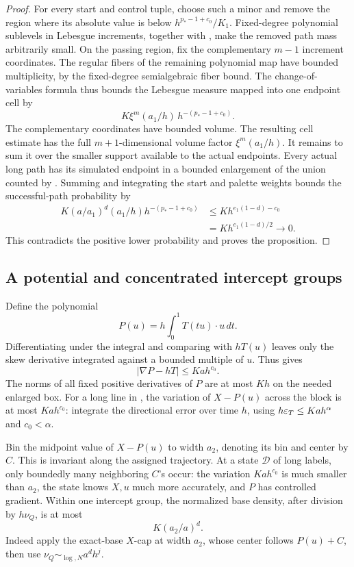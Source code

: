 \begin{proof}
For every start and control tuple, choose such a minor and remove
the region where its absolute value is below
\(h^{p_*-1+c_0}/K_1\). Fixed-degree polynomial sublevels in
Lebesgue increments, together with
, make the removed path mass
arbitrarily small. On the passing region, fix the complementary
\(m-1\) increment coordinates. The regular fibers of the remaining
polynomial map have bounded multiplicity, by the fixed-degree
semialgebraic fiber bound. The change-of-variables formula thus
bounds the Lebesgue measure mapped into one endpoint cell by
\[
 K\xi^m(a_1/h)\,h^{-(p_*-1+c_0)}.
\]
The complementary coordinates have bounded volume. The resulting
cell estimate has the full \(m+1\)-dimensional volume factor
\(\xi^m(a_1/h)\). It remains to sum it over the smaller support
available to the actual endpoints.
Every actual long path has its simulated endpoint in a bounded
enlargement of the union counted by .
Summing and integrating the start and palette weights bounds
the successful-path probability by
\[
 \begin{aligned}
 K(a/a_1)^d(a_1/h)h^{-(p_*-1+c_0)}
 &\leq K h^{e_1(1-d)-c_0}\\
 &=K h^{e_1(1-d)/2}\longrightarrow0.
 \end{aligned}
\]
This contradicts the positive lower probability and proves the
proposition.
\end{proof}

\subsection{A potential and concentrated intercept groups}

Define the polynomial
\[
 P(u)=h\int_0^1T(tu)\cdot u\,dt.
\]
Differentiating under the integral and comparing with \(hT(u)\)
leaves only the skew derivative integrated against a bounded
multiple of \(u\). Thus  gives
\begin{equation}\label{a05:potential-error}
 |\nabla P-hT|\leq Kah^{c_0}.
\end{equation}
The norms of all fixed positive derivatives of \(P\) are at
most \(Kh\) on the needed enlarged box.
For a long line in ,
the variation of \(X-P(u)\) across the block is at most
\(Kah^{c_0}\): integrate the directional error over time \(h\),
using \(h\varepsilon_T\leq Kah^\alpha\) and \(c_0<\alpha\).

Bin the midpoint value of \(X-P(u)\) to width \(a_2\), denoting
its bin and center by \(C\). This is invariant along the
assigned trajectory. At a state \(\mathcal D\) of long labels,
only boundedly many neighboring \(C\)'s occur:
the variation \(Kah^{c_0}\) is much smaller than \(a_2\), the
state knows \(X,u\) much more accurately, and \(P\) has controlled
gradient.
Within one intercept group, the normalized base density, after
division by \(h\nu_Q\), is at most
\begin{equation}\label{a05:intercept-base-cap}
 K(a_2/a)^d.
\end{equation}
Indeed apply the exact-base \(X\)-cap at width \(a_2\), whose
center follows \(P(u)+C\), then use
\(\nu_Q\sim_{\log,N}a^dh^j\).


